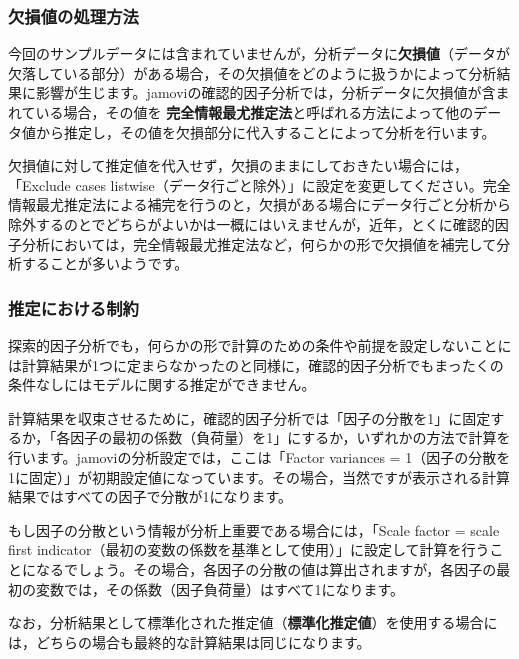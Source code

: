 \documentclass[
  12pt,
  a5jpaper,
  lualatex, ja=standard]{bxjsbook}
\renewcommand{\emph}[1]{\textbf{\color{emph} #1}}
\begin{document}
\hypertarget{subsub:factor-cfa-missing}{%
\subsubsection*{欠損値の処理方法}\label{subsub:factor-cfa-missing}}

今回のサンプルデータには含まれていませんが，分析データに\textbf{欠損値}（データが欠落している部分）がある場合，その欠損値をどのように扱うかによって分析結果に影響が生じます。jamoviの確認的因子分析では，分析データに欠損値が含まれている場合，その値を\emph{完全情報最尤推定法}と呼ばれる方法によって他のデータ値から推定し，その値を欠損部分に代入することによって分析を行います。

欠損値に対して推定値を代入せず，欠損のままにしておきたい場合には，「Exclude cases listwise（データ行ごと除外）」に設定を変更してください。完全情報最尤推定法による補完を行うのと，欠損がある場合にデータ行ごと分析から除外するのとでどちらがよいかは一概にはいえませんが，近年，とくに確認的因子分析においては，完全情報最尤推定法など，何らかの形で欠損値を補完して分析することが多いようです。

\hypertarget{subsub:factor-cfa-constraints}{%
\subsubsection*{推定における制約}\label{subsub:factor-cfa-constraints}}

探索的因子分析でも，何らかの形で計算のための条件や前提を設定しないことには計算結果が1つに定まらなかったのと同様に，確認的因子分析でもまったくの条件なしにはモデルに関する推定ができません。

計算結果を収束させるために，確認的因子分析では「因子の分散を1」に固定するか，「各因子の最初の係数（負荷量）を1」にするか，いずれかの方法で計算を行います。jamoviの分析設定では，ここは「Factor variances = 1（因子の分散を1に固定）」が初期設定値になっています。その場合，当然ですが表示される計算結果ではすべての因子で分散が1になります。

もし因子の分散という情報が分析上重要である場合には，「Scale factor = scale first indicator（最初の変数の係数を基準として使用）」に設定して計算を行うことになるでしょう。その場合，各因子の分散の値は算出されますが，各因子の最初の変数では，その係数（因子負荷量）はすべて1になります。

なお，分析結果として標準化された推定値（\textbf{標準化推定値}）を使用する場合には，どちらの場合も最終的な計算結果は同じになります。
\end{document}
